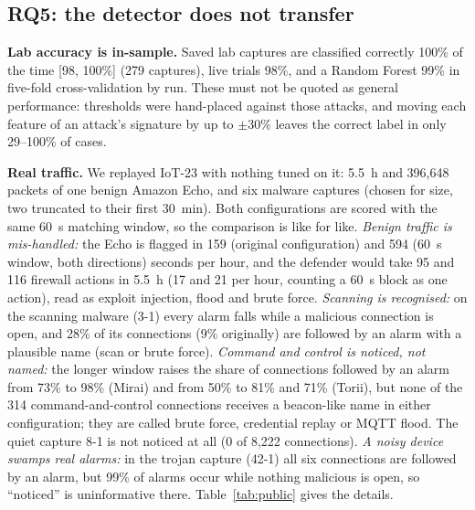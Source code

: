 \documentclass[conference]{IEEEtran}
\begin{document}
\subsection{RQ5: the detector does not transfer}
\label{sec:eval-rq5}
\textbf{Lab accuracy is in-sample.} Saved lab captures are classified correctly 100\% of the time [98, 100\%] (279 captures), live trials 98\%, and a Random Forest 99\% in five-fold cross-validation by run. These must not be quoted as general performance: thresholds were hand-placed against those attacks, and moving each feature of an attack's signature by up to $\pm30$\% leaves the correct label in only 29--100\% of cases.

\textbf{Real traffic.} We replayed IoT-23 \cite{garcia2020iot23,paxson1999bro} with nothing tuned on it: 5.5~h and 396{,}648 packets of one benign Amazon Echo, and six malware captures (chosen for size, two truncated to their first 30~min). Both configurations are scored with the same 60~s matching window, so the comparison is like for like. \emph{Benign traffic is mis-handled:} the Echo is flagged in 159 (original configuration) and 594 (60~s window, both directions) seconds per hour, and the defender would take 95 and 116 firewall actions in 5.5~h (17 and 21 per hour, counting a 60~s block as one action), read as exploit injection, flood and brute force. \emph{Scanning is recognised:} on the scanning malware (3-1) every alarm falls while a malicious connection is open, and 28\% of its connections (9\% originally) are followed by an alarm with a plausible name (scan or brute force). \emph{Command and control is noticed, not named:} the longer window raises the share of connections followed by an alarm from 73\% to 98\% (Mirai) and from 50\% to 81\% and 71\% (Torii), but none of the 314 command-and-control connections receives a beacon-like name in either configuration; they are called brute force, credential replay or MQTT flood. The quiet capture 8-1 is not noticed at all (0 of 8{,}222 connections). \emph{A noisy device swamps real alarms:} in the trojan capture (42-1) all six connections are followed by an alarm, but 99\% of alarms occur while nothing malicious is open, so ``noticed'' is uninformative there. Table~\ref{tab:public} gives the details.
\end{document}
